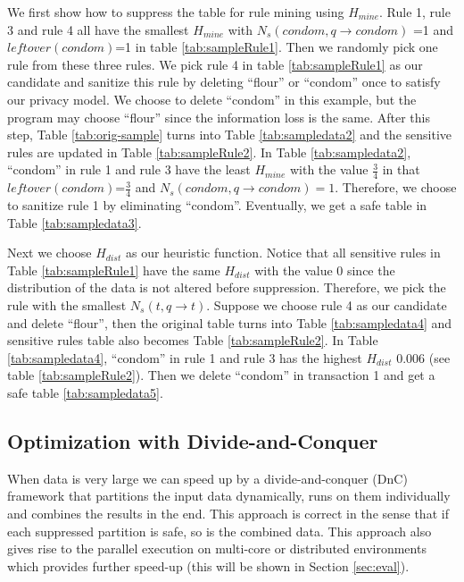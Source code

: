 {We first show how to suppress the table for rule mining using $H_{mine}$.
Rule 1, rule 3 and rule 4 all have the smallest $H_{mine}$ with $N_s(condom, q\rightarrow condom)$ =1 and $leftover(condom)$=1 in table \ref{tab:sampleRule1}. Then we randomly pick one rule from these three rules. We pick rule 4
in table \ref{tab:sampleRule1} as our candidate and
sanitize this rule by deleting ``flour'' or ``condom'' once to satisfy our privacy model. We choose to delete ``condom'' in this example, but the program may choose ``flour''
since the information loss is the same.
After this step, Table \ref{tab:orig-sample} turns into
Table \ref{tab:sampledata2} and the sensitive rules are updated in
Table \ref{tab:sampleRule2}. In Table \ref{tab:sampledata2},
``condom'' in rule 1 and rule 3 have the least $H_{mine}$ with
the value $\frac{3}{4}$ in that $leftover(condom)$=$\frac{3}{4}$ and
$N_s(condom, q\rightarrow condom)=1$. Therefore, we choose to
sanitize rule 1 by eliminating ``condom''.
Eventually, we get a safe table in Table \ref{tab:sampledata3}.

Next we choose $H_{dist}$ as our heuristic function.
Notice that all sensitive rules in Table  \ref{tab:sampleRule1}
have the same $H_{dist}$ with the value 0 since the
distribution of the data is not altered before suppression.
Therefore, we pick the rule with the smallest
 $N_s(t, q\rightarrow t)$. Suppose we choose rule 4 as our candidate and
delete ``flour'', then the original table turns into
Table \ref{tab:sampledata4} and sensitive rules
table also becomes Table \ref{tab:sampleRule2}.
In Table \ref{tab:sampledata4}, ``condom'' in rule 1 and rule 3 has
 the highest $H_{dist}$ 0.006 (see table \ref{tab:sampleRule2}). Then we delete ``condom'' in transaction 1 and get a safe table \ref{tab:sampledata5}.
}%

\subsection{Optimization with Divide-and-Conquer}
\label{algo:impmentation}

When data is very large we can speed up by
a divide-and-conquer (DnC) framework that
partitions the input data dynamically,
runs \PartialSuppressor
on them individually and combines the results in the end. This approach is
correct in the sense that if each suppressed partition is safe, so is the
combined data. This approach also gives rise to the parallel execution
on multi-core or distributed environments which provides further speed-up
(this will be shown in Section \ref{sec:eval}).

